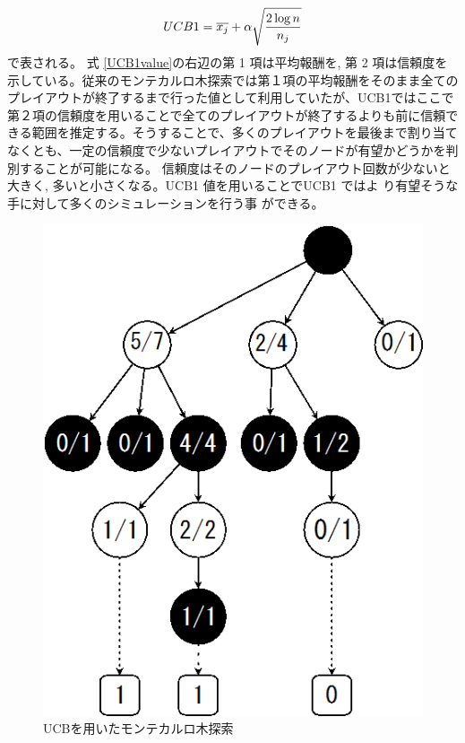 \begin{equation}
\label{UCB1value}
\Large UCB1 = \overline {x_{j}}+\alpha \sqrt {\displaystyle \frac {2\log{n}} {n_{j}}}
\end{equation}
で表される。
式 \ref{UCB1value}の右辺の第 1 項は平均報酬を, 第 2 項は信頼度を示している。従来のモンテカルロ木探索では第１項の平均報酬をそのまま全てのプレイアウトが終了するまで行った値として利用していたが、UCB1ではここで第２項の信頼度を用いることで全てのプレイアウトが終了するよりも前に信頼できる範囲を推定する。そうすることで、多くのプレイアウトを最後まで割り当てなくとも、一定の信頼度で少ないプレイアウトでそのノードが有望かどうかを判別することが可能になる。
信頼度はそのノードのプレイアウト回数が少ないと大きく, 多いと小さくなる。UCB1 値を用いることでUCB1 ではよ り有望そうな手に対して多くのシミュレーションを行う事 ができる。

\begin{figure}
 \centering
 \includegraphics[keepaspectratio, scale=0.75,bb=0 0 304 387]
      {img/UCB.png}
 \caption{UCBを用いたモンテカルロ木探索}
 \label{monte2}
\end{figure}

